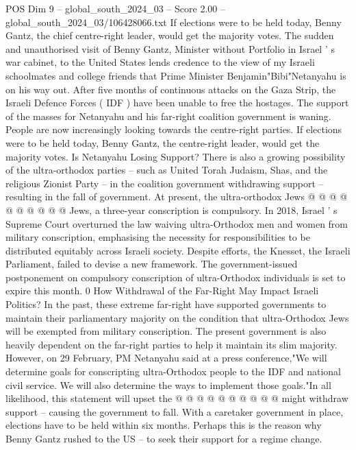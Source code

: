 \begin{textsample}{POS Dim 9 – global\_south\_2024\_03 – Score 2.00 – global\_south\_2024\_03/106428066.txt}  \label{ex:f9_pos_065}
If elections were to be held today, Benny Gantz, the chief centre-right leader, would get the majority votes.
The sudden and unauthorised visit of Benny Gantz, Minister without Portfolio in Israel ' s war cabinet, to the United States lends credence to the view of my Israeli schoolmates and college friends that Prime Minister Benjamin"Bibi"Netanyahu is on his way out.
After five months of continuous attacks on the Gaza Strip, the Israeli Defence Forces ( IDF ) have been unable to free the hostages.
The support of the masses for Netanyahu and his far-right coalition government is waning.
People are now increasingly looking towards the centre-right parties.
If elections were to be held today, Benny Gantz, the centre-right leader, would get the majority votes.
Is Netanyahu Losing Support?
There is also a growing possibility of the ultra-orthodox parties -- such as United Torah Judaism, Shas, and the religious Zionist Party -- in the coalition government withdrawing support -- resulting in the fall of government.
At present, the ultra-orthodox Jews @ @ @ @ @ @ @ @ @ @ Jews, a three-year conscription is compulsory.
In 2018, Israel ' s Supreme Court overturned the law waiving ultra-Orthodox men and women from military conscription, emphasising the necessity for responsibilities to be distributed equitably across Israeli society.
Despite efforts, the Knesset, the Israeli Parliament, failed to devise a new framework.
The government-issued postponement on compulsory conscription of ultra-Orthodox individuals is set to expire this month. 0 How Withdrawal of the Far-Right May Impact Israeli Politics?
In the past, these extreme far-right have supported governments to maintain their parliamentary majority on the condition that ultra-Orthodox Jews will be exempted from military conscription.
The present government is also heavily dependent on the far-right parties to help it maintain its slim majority.
However, on 29 February, PM Netanyahu said at a press conference,"We will determine goals for conscripting ultra-Orthodox people to the IDF and national civil service.
We will also determine the ways to implement those goals."In all likelihood, this statement will upset the @ @ @ @ @ @ @ @ @ @ might withdraw support -- causing the government to fall.
With a caretaker government in place, elections have to be held within six months.
Perhaps this is the reason why Benny Gantz rushed to the US -- to seek their support for a regime change.

\end{textsample}
